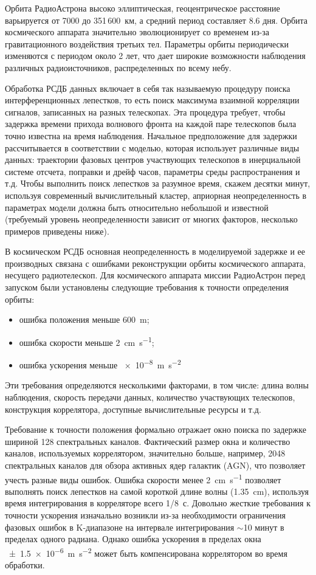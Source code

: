 Орбита РадиоАстрона высоко эллиптическая, геоцентрическое расстояние варьируется от 7000 до
351\,600~км, а средний период составляет 8.6 дня. Орбита космического аппарата значительно
эволюционирует со временем из-за гравитационного воздействия третьих тел. Параметры орбиты
периодически изменяются с периодом около 2 лет, что дает широкие возможности наблюдения различных
радиоисточников, распределенных по всему небу.

Обработка РСДБ данных включает в себя так называемую процедуру поиска интерференционных лепестков,
то есть поиск максимума взаимной корреляции сигналов, записанных на разных телескопах. Эта
процедура требует, чтобы задержка времени прихода волнового фронта на каждой паре телескопов была
точно известна на время наблюдения. Начальное предположение для задержки рассчитывается в
соответствии с моделью, которая использует различные виды данных: траектории фазовых центров
участвующих телескопов в инерциальной системе отсчета, поправки и дрейф часов, параметры среды
распространения и т.д. Чтобы выполнить поиск лепестков за разумное время, скажем десятки минут,
используя современный вычислительный кластер, априорная неопределенность в параметрах модели должна
быть относительно небольшой и известной (требуемый уровень неопределенности зависит от многих
факторов, несколько примеров приведены ниже).

В космическом РСДБ основная неопределенность в моделируемой задержке и ее производных связана с
ошибками реконструкции орбиты космического аппарата, несущего радиотелескоп. Для
космического аппарата миссии РадиоАстрон перед запуском были установлены следующие требования к
точности определения орбиты:

\begin{itemize}
 \item ошибка положения меньше \SI{600}{\meter};
 \item ошибка скорости меньше \SI{2}{\cm\per\second};
 \item ошибка ускорения меньше \SI{e-8}{\meter\per\square\second}
\end{itemize}

Эти требования определяются несколькими факторами, в том числе: длина волны наблюдения,
скорость передачи данных, количество участвующих телескопов, конструкция коррелятора, доступные
вычислительные ресурсы и т.д.

Требование к точности положения формально отражает окно поиска по задержке шириной 128
спектральных каналов. Фактический размер окна и количество каналов, используемых коррелятором,
значительно больше, например, 2048 спектральных каналов для обзора активных ядер галактик (AGN), что
позволяет учесть разные виды ошибок. Ошибка скорости менее \SI{2}{\cm\per\second} позволяет
выполнять поиск лепестков на самой короткой длине волны (\SI{1.35}{\cm}), используя время
интегрирования в корреляторе всего 1/8~с. Довольно жесткие требования к точности ускорения
изначально возникли из-за необходимости ограничения фазовых ошибок в K-диапазоне на
интервале интегрирования $\sim$10 минут в пределах одного радиана. Однако ошибка ускорения в
пределах окна \SI{+-1.5e-6}{\meter\per\square\second} может быть компенсирована коррелятором во
время обработки.

